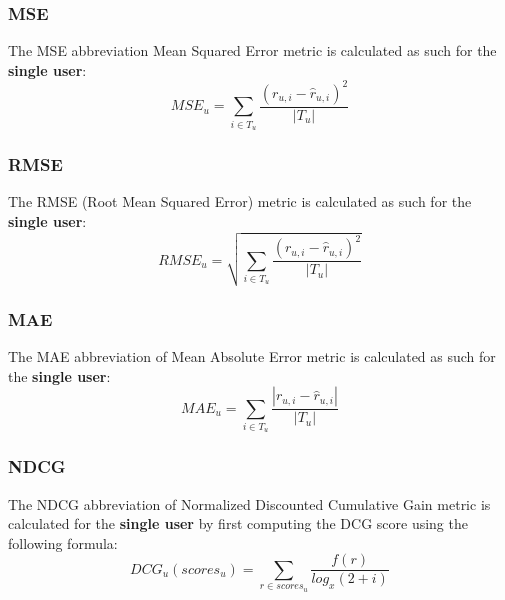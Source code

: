 \documentclass[11pt]{article}
\begin{document}

\subsubsection{MSE}\label{subsubsec:mse}
The MSE abbreviation Mean Squared Error metric is calculated as such for the \textbf{single user}:
\hfill\break
\hfill\break
    \[
        MSE_u = \sum_{i \in T_u} \frac{(r_{u,i} - \hat{r}_{u,i})^2}{|T_u|}
    \]


\subsubsection{RMSE}\label{subsubsec:rmse}
The RMSE (Root Mean Squared Error) metric is calculated as such for the \textbf{single user}:
\hfill\break
\hfill\break
    \[
        RMSE_u = \sqrt{\sum_{i \in T_u} \frac{(r_{u,i} - \hat{r}_{u,i})^2}{|T_u|}}
    \]
\hfill\break


\subsubsection{MAE}\label{subsubsec:mae}
The MAE abbreviation of Mean Absolute Error metric is calculated as such for the \textbf{single user}:
\hfill\break
\hfill\break
    \[
        MAE_u = \sum_{i \in T_u} \frac{|r_{u,i} - \hat{r}_{u,i}|}{|T_u|}
    \]
\hfill\break


\subsubsection{NDCG}\label{subsubsec:ndcg}
The NDCG abbreviation of Normalized Discounted Cumulative Gain metric is calculated for the \textbf{single user}
by first computing the DCG score using the following formula:
\hfill\break
\hfill\break
    \[
        DCG_{u}(scores_{u}) = \sum_{r\in scores_{u}}{\frac{f(r)}{log_x(2 + i)}}
    \]
\hfill\break
\end{document}
